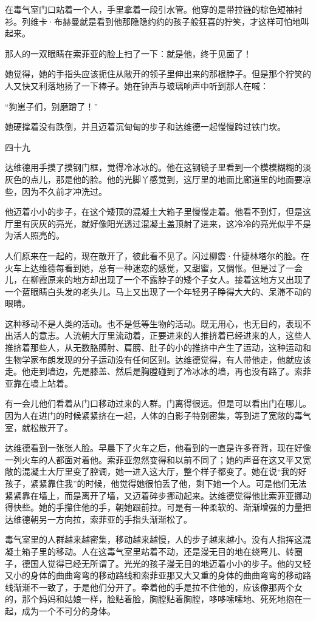 在毒气室门口站着一个人，手里拿着一段引水管。他穿的是带拉链的棕色短袖衬衫。列维卡·布赫曼就是看到他那隐隐约约的孩子般狂喜的狞笑，才这样可怕地叫起来。

那人的一双眼睛在索菲亚的脸上扫了一下：就是他，终于见面了！

她觉得，她的手指头应该扼住从敞开的领子里伸出来的那根脖子。但是那个狞笑的人又快又利落地扬了一下棒子。她在钟声与玻璃响声中听到那人在喊：

“狗崽子们，别磨蹭了！”

她硬撑着没有跌倒，并且迈着沉甸甸的步子和达维德一起慢慢跨过铁门坎。

四十九

达维德用手摸了摸钢门框，觉得冷冰冰的。他在这钢镜子里看到一个模模糊糊的淡灰色的点儿，那是他的脸。他的光脚丫感觉到，这厅里的地面比廊道里的地面要凉些，因为不久前才冲洗过。

他迈着小小的步子，在这个矮顶的混凝土大箱子里慢慢走着。他看不到灯，但是这厅里有灰灰的亮光，就好像阳光透过混凝土盖顶射了进来，这冷冷的亮光似乎不是为活人照亮的。

人们原来在一起的，现在散开了，彼此看不见了。闪过柳霞·什捷林塔尔的脸。在火车上达维德每看到她，总有一种迷恋的感觉，又甜蜜，又惆怅。但是过了一会儿，在柳霞原来的地方却出现了一个不露脖子的矮个子女人。接着这地方又出现了一个蓝眼睛白头发的老头儿。马上又出现了一个年轻男子睁得大大的、呆滞不动的眼睛。

这种移动不是人类的活动。也不是低等生物的活动。既无用心，也无目的，表现不出活人的意志。人流朝大厅里流动着，正要进来的人推挤着已经进来的人，这些人推挤着那些人，从无数胳膊肘、肩膀、肚子的小的推挤中产生了运动，这种运动和生物学家布朗发现的分子运动没有任何区别。达维德觉得，有人带他走，他就应该走。他走到墙边，先是膝盖、然后是胸膛碰到了冷冰冰的墙，再也没有路了。索菲亚靠在墙上站着。

有一会儿他们看着从门口移动过来的人群。门离得很远。但是可以看出门在哪儿。因为人在进门的时候紧紧挤在一起，人体的白影子特别密集，等到进了宽敞的毒气室，就松散开了。

达维德看到一张张人脸。早晨下了火车之后，他看到的一直是许多脊背，现在好像一列火车的人都面对着他。索菲亚忽然变得和以前不同了；她的声音在这又平又宽敞的混凝土大厅里变了腔调，她一进入这大厅，整个样子都变了。她在说“我的好孩子，紧紧靠住我”的时候，他觉得她很怕丢了他，剩下她一个人。可是他们无法紧紧靠在墙上，而是离开了墙，又迈着碎步挪动起来。达维德觉得他比索菲亚挪动得快些。她的手攥住他的手，朝她跟前拉。可是有一种柔软的、渐渐增强的力量把达维德朝另一方向拉，索菲亚的手指头渐渐松了。

毒气室里的人群越来越密集，移动越来越慢，人的步子越来越小。没有人指挥这混凝土箱子里的移动。人在这毒气室里站着不动，还是漫无目的地在绕弯儿、转圈子，德国人觉得已经无所谓了。光光的孩子漫无目的地迈着小小的步子。他的又轻又小的身体的曲曲弯弯的移动路线和索菲亚那又大又重的身体的曲曲弯弯的移动路线渐渐不一致了，于是他们分开了。牵着他的手是拉不住他的，应该像那两个女的，那个妈妈和姑娘一样，脸贴着脸，胸膛贴着胸膛，哆哆嗦嗦地、死死地抱在一起，成为一个不可分的身体。

